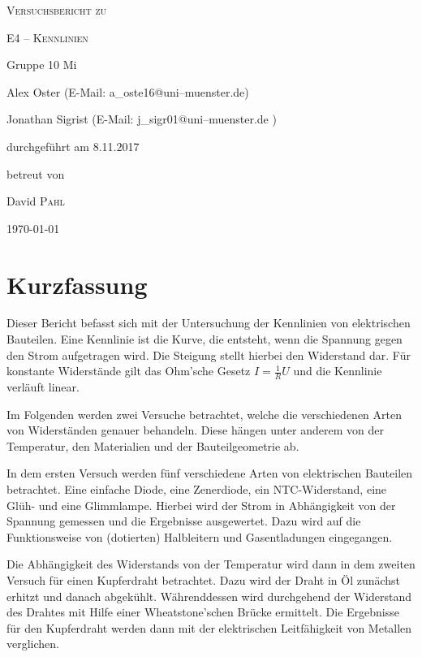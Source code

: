 \documentclass[11pt,a4paper,titlepage, ngerman]{article}
\begin{document}
	
	\begin{titlepage}
		\centering
		{\scshape\LARGE Versuchsbericht zu \par}
		\vspace{1cm}
		{\scshape\huge E4 -- Kennlinien\par}
		\vspace{2.5cm}
		{\LARGE Gruppe 10 Mi\par}
		\vspace{0.5cm}
		{\large Alex Oster (E-Mail: a\_oste16@uni--muenster.de) \par}
		{\large Jonathan Sigrist (E-Mail: j\_sigr01@uni--muenster.de ) \par}
		\vfill
		durchgeführt am 8.11.2017\par
		betreut von\par
		{\large David \textsc{Pahl}}
		
		\vfill
		
		{\large \today\par}
	\end{titlepage}
		
	\tableofcontents
	
	\newpage
	
	\section{Kurzfassung}
		
		Dieser Bericht befasst sich mit der Untersuchung der Kennlinien von elektrischen Bauteilen. Eine Kennlinie ist die Kurve, die entsteht, wenn die Spannung gegen den Strom aufgetragen wird. Die Steigung stellt hierbei den Widerstand dar. Für konstante Widerstände gilt das Ohm'sche Gesetz $I = \frac{1}{R}U$ und die Kennlinie verläuft linear.
		
		Im Folgenden werden zwei Versuche betrachtet, welche die verschiedenen Arten von Widerständen genauer behandeln.
		Diese hängen unter anderem von der Temperatur, den Materialien und der Bauteilgeometrie ab.
		
		In dem ersten Versuch werden fünf verschiedene Arten von elektrischen Bauteilen betrachtet. Eine einfache Diode, eine Zenerdiode, ein NTC-Widerstand, eine Glüh- und eine Glimmlampe. Hierbei wird der Strom in Abhängigkeit von der Spannung gemessen und die Ergebnisse ausgewertet. Dazu wird auf die Funktionsweise von (dotierten) Halbleitern und Gasentladungen eingegangen. 
		
		Die Abhängigkeit des Widerstands von der Temperatur wird dann in dem zweiten Versuch für einen Kupferdraht betrachtet.
		Dazu wird der Draht in Öl zunächst erhitzt und danach abgekühlt. Währenddessen wird durchgehend der Widerstand des Drahtes mit Hilfe einer Wheatstone'schen Brücke ermittelt. Die Ergebnisse für den Kupferdraht werden dann mit der elektrischen Leitfähigkeit von Metallen verglichen.
\end{document}

